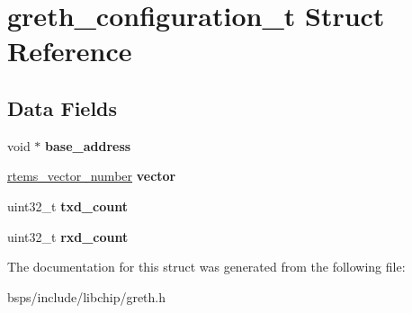 \hypertarget{structgreth__configuration__t}{}\section{greth\+\_\+configuration\+\_\+t Struct Reference}
\label{structgreth__configuration__t}
\subsection*{Data Fields}
\begin{DoxyCompactItemize}
\item 
\mbox{\label{structgreth__configuration__t_a70bebb56f5a2719578f162365c8cba24}} 
void $\ast$ {\bfseries base\+\_\+address}
\item 
\mbox{\label{structgreth__configuration__t_a58f2a0031909dcfa5dfe6899bc67e0d8}} 
\mbox{\hyperlink{group__ClassicINTR_ga3e434c197d99f128e78cae4d9358bd8b}{rtems\+\_\+vector\+\_\+number}} {\bfseries vector}
\item 
\mbox{\label{structgreth__configuration__t_ac2470378a706d1011f75307f3dfd5089}} 
uint32\+\_\+t {\bfseries txd\+\_\+count}
\item 
\mbox{\label{structgreth__configuration__t_a9aa626e5417ee05849be17cf74353615}} 
uint32\+\_\+t {\bfseries rxd\+\_\+count}
\end{DoxyCompactItemize}


The documentation for this struct was generated from the following file\+:\begin{DoxyCompactItemize}
\item 
bsps/include/libchip/greth.\+h\end{DoxyCompactItemize}
